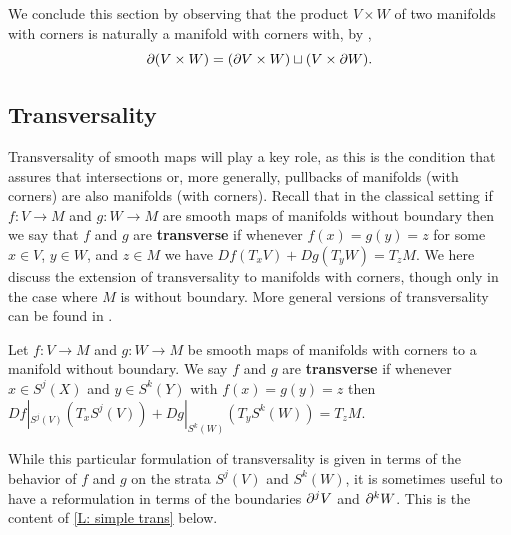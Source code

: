 \begin{remark}
We conclude this section by observing that the product $V\times W$ of two manifolds with corners is naturally a manifold with corners with, by \cite[Proposition 2.12]{Joy12},
$$\partial (V\times W)= (\partial V\times W)\sqcup (V\times \partial W).$$

\subsection{Transversality}

Transversality of smooth maps will play a key role, as this is the condition that assures that intersections or, more generally, pullbacks of manifolds (with corners) are also manifolds (with corners).
Recall that in the classical setting if $f \colon V \to M$ and $g \colon W\to M$ are smooth maps of manifolds without boundary then we say that $f$ and $g$ are \textbf{transverse} if whenever $f(x)=g(y)=z$ for some $x\in V$, $y\in W$, and $z\in M$ we have $Df(T_xV)+Dg(T_yW)=T_z M$.
We here discuss the extension of transversality to manifolds with corners, though only in the case where $M$ is without boundary.
More general versions of transversality can be found in \cite[Section 6]{Joy12}.

\begin{definition}{\cite[Special case of Definition 6.1]{Joy12}}
	Let $f \colon V\to M$ and $g \colon W\to M$ be smooth maps of manifolds with corners to a manifold without boundary.
	We say $f$ and $g$ are \textbf{transverse} if whenever $x\in S^j(X)$ and $y\in S^k(Y)$ with $f(x)=g(y)=z$ then $Df|_{S^j(V)}(T_xS^j(V))+Dg|_{S^k(W)}(T_yS^k(W))=T_zM$.
\end{definition}

While this particular formulation of transversality is given in terms of the behavior of $f$ and $g$ on the strata $S^j(V)$ and $S^k(W)$, it is sometimes useful to have a reformulation in terms of the boundaries $\partial^j V$ and $\partial^kW$.
This is the content of \cref{L: simple trans} below.


\end{remark}
